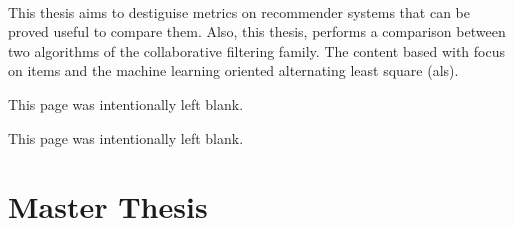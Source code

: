 \documentclass[10pt, a4paper, oneside]{journal}
\begin{document}
	\paragraph{} This thesis aims to destiguise metrics on recommender systems  that can be proved useful to compare them. Also, this thesis, performs a comparison between two algorithms of the collaborative filtering family. The content based with focus on items and the machine learning oriented alternating least square (als).
	
	\tableofcontents
	\newpage
	\begin{center}
		This page was intentionally left blank.
	\end{center}
	\newpage
	\listoftables
	\newpage
	\listoffigures
	\newpage
	
	\begin{center}
		This page was intentionally left blank.
	\end{center}
	\newpage
	\part{Master Thesis}
	
	
	
	
	
	\newpage
	
	
\end{document}
